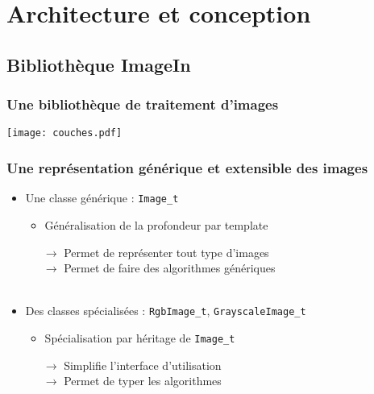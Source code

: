 \section{Architecture et conception}

\subsection{Bibliothèque ImageIn}

\begin{frame}
	\frametitle{Une bibliothèque de traitement d'images}
	\begin{center}
	\texttt{[image: couches.pdf]}
	\end{center}
\end{frame}

\begin{frame}
	\frametitle{Une représentation générique et extensible des images}
	\begin{itemize}
		\item Une classe générique : \texttt{Image\_t}
		    \begin{itemize}
			\item Généralisation de la profondeur par template
		    \end{itemize}
		    \small
		    ~~~$\longrightarrow$ Permet de représenter tout type d'images\\
		    ~~~$\longrightarrow$ Permet de faire des algorithmes génériques
		    \normalsize
        ~\\~\\
		\item Des classes spécialisées : \texttt{RgbImage\_t}, \texttt{GrayscaleImage\_t}
		    \begin{itemize}
		    \item Spécialisation par héritage de \texttt{Image\_t}
		    \end{itemize}
		    \small
		     ~~~$\longrightarrow$ Simplifie l'interface d'utilisation\\
		     ~~~$\longrightarrow$ Permet de typer les algorithmes
		    \normalsize
	\end{itemize}
\end{frame}

